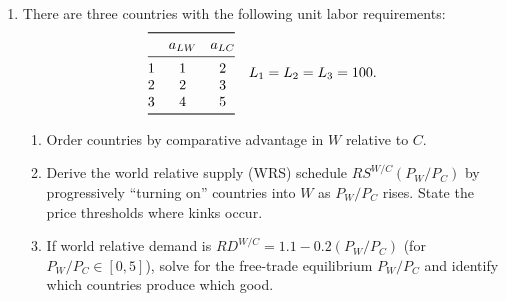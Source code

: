 \documentclass[11pt]{article}
\begin{document}
\begin{enumerate}[leftmargin=*, resume]
\item 
There are three countries with the following unit labor requirements:
\[
\begin{array}{@{}lcc@{}}
\toprule
 & a_{LW} & a_{LC} \\
\midrule
1 & 1 & 2 \\
2 & 2 & 3 \\
3 & 4 & 5 \\
\bottomrule
\end{array}
\quad L_1=L_2=L_3=100.
\]
\begin{enumerate}
\item Order countries by comparative advantage in $W$ relative to $C$.
\item Derive the world relative supply (WRS) schedule $RS^{W/C}(P_W/P_C)$ by progressively ``turning on'' countries into $W$ as $P_W/P_C$ rises. State the price thresholds where kinks occur.
\item If world relative demand is $RD^{W/C}=1.1 - 0.2(P_W/P_C)$ (for $P_W/P_C\in[0,5]$), solve for the free-trade equilibrium $P_W/P_C$ and identify which countries produce which good.
\end{enumerate}


\end{enumerate}
\end{document}

